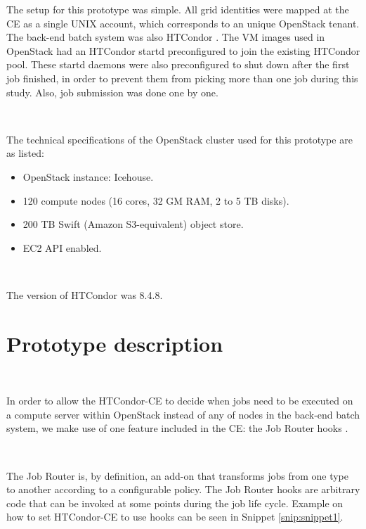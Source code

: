 \documentclass[a4paper]{jpconf}
\begin{document}
The setup for this prototype was simple. 
All grid identities were mapped at the CE as a single UNIX account, which
corresponds to an unique OpenStack tenant.
The back-end batch system was also HTCondor \cite{condor}.
The VM images used in OpenStack had an HTCondor startd preconfigured to join the
existing HTCondor pool.
These startd daemons were also preconfigured to shut down after the first job finished, 
in order to prevent them from picking more than one job during this study.
Also, job submission was done one by one.

~

The technical specifications of the OpenStack cluster used for this prototype are as listed: 

\begin{itemize}
\item OpenStack instance: Icehouse.
\item 120 compute nodes (16 cores, 32 GM RAM, 2 to 5 TB disks).
\item 200 TB Swift (Amazon S3-equivalent) object store.
\item EC2 API enabled.
\end{itemize}

~

The version of HTCondor was 8.4.8.

\section{Prototype description}

~

In order to allow the HTCondor-CE to decide when jobs need to be executed on a
compute server within OpenStack instead of any of nodes in the back-end batch
system, we make use of one feature included in the CE: the Job Router hooks \cite{jobrouter}.

~

The Job Router is, by definition, an add-on that transforms jobs from one type to
another according to a configurable policy.
The Job Router hooks are arbitrary code that can be invoked at some points during the job life cycle.
Example on how to set HTCondor-CE to use hooks can be seen in Snippet \ref{snip:snippet1}.

\end{document}
